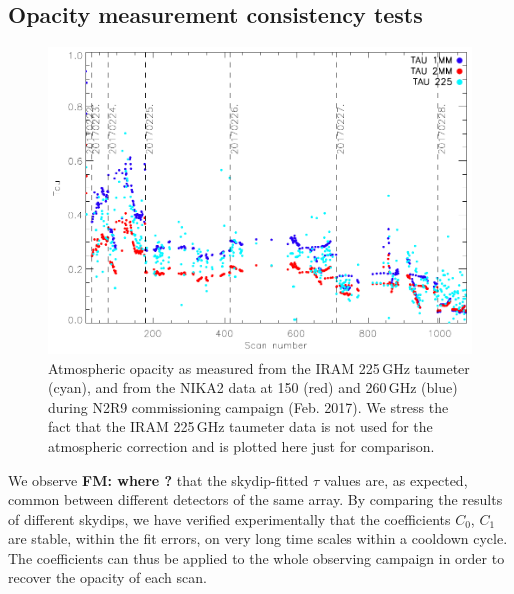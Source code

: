 \subsection{Opacity measurement consistency tests}


\begin{figure}
\begin{center}
\includegraphics[scale=0.8]{../../Paper_NIKA2_Technical/opacity_evol_run22.pdf}
\caption{Atmospheric opacity as measured from the IRAM 225\,GHz taumeter (cyan), and from the NIKA2 data at 150 (red) and 260\,GHz (blue) during 
  N2R9 commissioning campaign (Feb. 2017). We stress the fact that the IRAM 225\,GHz taumeter data is not used for the atmospheric correction and is plotted here just for comparison.
  \label{fig:taumeas}}
\end{center}
\end{figure}


We observe {\bf FM: where ?} that the skydip-fitted $\tau$ values are, as expected,
common between different detectors of the same array. By comparing
the results of different skydips, we have verified experimentally
that the coefficients $C_0$, $C_1$ are stable, within the fit
errors, on very long time scales within a cooldown cycle. The
coefficients can thus be applied to the whole observing campaign
in order to recover the opacity of each scan.


\\


